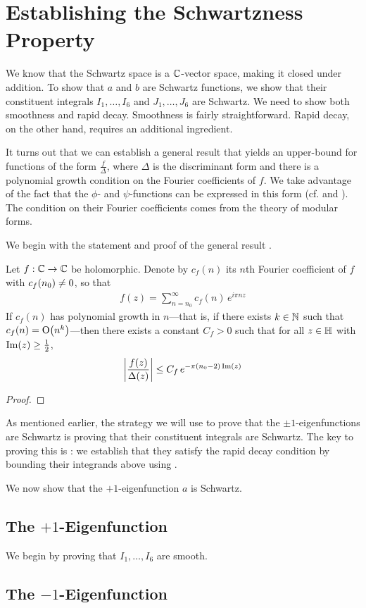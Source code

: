 \section{Establishing the Schwartzness Property}

We know that the Schwartz space is a $\mathbb{C}$-vector space, making it closed under addition. To show that $a$ and $b$ are Schwartz functions, we show that their constituent integrals $I_1, \ldots, I_6$ and $J_1, \ldots, J_6$ are Schwartz. We need to show both smoothness and rapid decay. Smoothness is fairly straightforward. Rapid decay, on the other hand, requires an additional ingredient.

It turns out that we can establish a general result that yields an upper-bound for functions of the form $\frac{f}{\Delta}$, where $\Delta$ is the discriminant form and there is a polynomial growth condition on the Fourier coefficients of $f$. We take advantage of the fact that the $\phi$- and $\psi$-functions can be expressed in this form (cf.  and ). The condition on their Fourier coefficients comes from the theory of modular forms.

We begin with the statement and proof of the general result \cite[Lemma 7.4]{blueprint}.

\begin{boxtheorem}\label{SP:PolyFourierCoeffBound}
    Let $f : \mathbb{C} \to \mathbb{C}$ be holomorphic. Denote by $c_f(n)$ its $n$th Fourier coefficient of $f$ with $c_f\!\left( n_0 \right) \neq 0$, so that
    \begin{align*}
        f(z) = \sum_{n=n_0}^{\infty} c_f(n) \, e^{i \pi n z}
    \end{align*}
    If $c_f(n)$ has polynomial growth in $n$---that is, if there exists $k \in \mathbb{N}$ such that $c_f(n) = \operatorname{O}\!\left( n^k \right)$---then there exists a constant $C_f > 0$ such that for all $z \in \mathbb{H}$ with $\operatorname{Im}\!\left( z \right) \geq \frac{1}{2}$,
    \begin{align*}
        \left\lvert \frac{f(z)}{\Delta(z)} \right\rvert \leq C_f \, e^{-\pi \left( n_0 - 2 \right) \operatorname{Im}(z)}
    \end{align*}
\end{boxtheorem}
\begin{proof}
    
\end{proof}

As mentioned earlier, the strategy we will use to prove that the $\pm 1$-eigenfunctions are Schwartz is proving that their constituent integrals are Schwartz. The key to proving this is : we establish that they satisfy the rapid decay condition by bounding their integrands above using .

We now show that the $+1$-eigenfunction $a$ is Schwartz.

\subsection{The $+1$-Eigenfunction}

We begin by proving that $I_1, \ldots, I_6$ are smooth.



\subsection{The $-1$-Eigenfunction}
